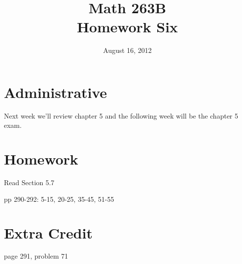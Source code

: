 \documentclass{exam}
\title{Math 263B \\ Homework Six}
\date{August 16, 2012}
\begin{document}
\maketitle

\ifprintanswers
\else
\section{Administrative}

Next week we'll review chapter 5 and the following week will be the chapter 5 exam.

\fi

\section{Homework}

\begin{itemize*}
  \item Read Section 5.7
  \item pp 290-292: 5-15, 20-25, 35-45, 51-55
\end{itemize*}


\section{Extra Credit}
page 291, problem 71
\end{document}
